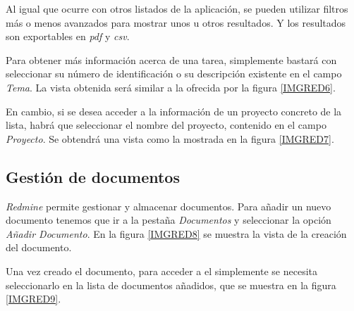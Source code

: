 \documentclass[11pt,a4paper,spanish,twoside]{report}
\begin{document}
	Al igual que ocurre con otros listados de la aplicación, se pueden utilizar
	filtros más o menos avanzados para mostrar unos u otros resultados. Y los
	resultados son exportables en \emph{pdf} y \emph{csv}.

	Para obtener más información acerca de una tarea, simplemente bastará con
	seleccionar su número de identificación o su descripción existente en el
	campo \emph{Tema}. La vista obtenida será similar a la ofrecida por la
	figura \ref{IMGRED6}.


	En cambio, si se desea acceder a la información de un proyecto concreto de
	la lista, habrá que seleccionar el nombre del proyecto, contenido en el
	campo \emph{Proyecto}. Se obtendrá una vista como la mostrada en la figura
	\ref{IMGRED7}.


	\subsection{Gestión de documentos}

        \emph{Redmine} permite gestionar y almacenar documentos. Para añadir
        un nuevo documento tenemos que ir a la pestaña \emph{Documentos} y
        seleccionar la opción \emph{Añadir Documento}. En la figura
        \ref{IMGRED8} se muestra la vista de la creación del documento.


        Una vez creado el documento, para acceder a el simplemente se
        necesita seleccionarlo en la lista de documentos añadidos, que se
        muestra en la figura \ref{IMGRED9}.

\end{document}
